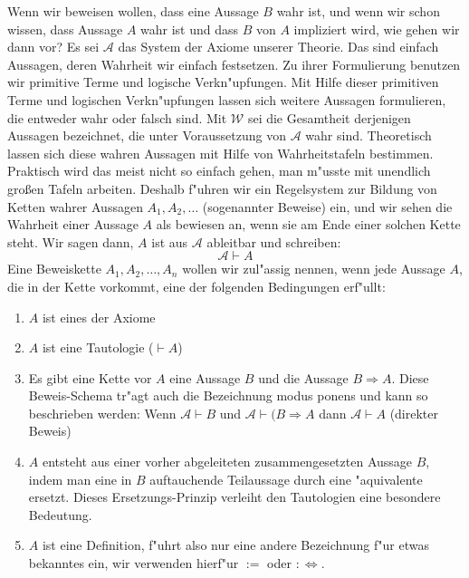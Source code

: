 Wenn wir beweisen wollen, dass eine Aussage $B$ wahr ist, und wenn wir schon wissen, dass Aussage $A$ wahr ist und dass $B$ von $A$ impliziert wird, wie gehen wir dann vor? Es sei $\mathcal{A}$ das System der Axiome unserer Theorie. Das sind einfach Aussagen, deren Wahrheit wir einfach festsetzen. Zu ihrer Formulierung benutzen wir primitive Terme und logische Verkn"upfungen. Mit Hilfe dieser primitiven Terme und logischen Verkn"upfungen lassen sich weitere Aussagen formulieren, die entweder wahr oder falsch sind. Mit $\mathcal{W}$ sei die Gesamtheit derjenigen Aussagen bezeichnet, die unter Voraussetzung von $\mathcal{A}$ wahr sind. Theoretisch lassen sich diese wahren Aussagen mit Hilfe von Wahrheitstafeln bestimmen. Praktisch wird das meist nicht so einfach gehen, man m"usste mit unendlich gro{\ss}en Tafeln arbeiten. Deshalb f"uhren wir ein Regelsystem zur Bildung von Ketten wahrer Aussagen $A_1, A_2, \ldots$ (sogenannter Beweise) ein, und wir sehen die Wahrheit einer Aussage $A$ als bewiesen an, wenn sie am Ende einer solchen Kette steht. Wir sagen dann, $A$ ist aus $\mathcal{A}$ ableitbar und schreiben:
\begin{equation*}
 \mathcal{A} \vdash A
\end{equation*}
Eine Beweiskette $A_1, A_2, \ldots, A_n$ wollen wir zul"assig nennen, wenn jede Aussage $A$, die in der Kette vorkommt, eine der folgenden Bedingungen erf"ullt:
\begin{enumerate}
\item $A$ ist eines der Axiome
\item $A$ ist eine Tautologie ($\vdash A$)
\item Es gibt eine Kette vor $A$ eine Aussage $B$ und die Aussage $B \Rightarrow A$. Diese Beweis-Schema tr"agt auch die Bezeichnung modus ponens und kann so beschrieben werden:
Wenn $\mathcal{A} \vdash B$ und $\mathcal{A} \vdash (B \Rightarrow A$ dann $\mathcal{A} \vdash A$ (direkter Beweis)
\item $A$ entsteht aus einer vorher abgeleiteten zusammengesetzten Aussage $B$, indem man eine in $B$ auftauchende Teilaussage durch eine "aquivalente ersetzt. Dieses Ersetzungs-Prinzip verleiht den Tautologien eine besondere Bedeutung.
\item $A$ ist eine Definition, f"uhrt also nur eine andere Bezeichnung f"ur etwas bekanntes ein, wir verwenden hierf"ur $:=$ oder $:\iff$.
\end{enumerate}

